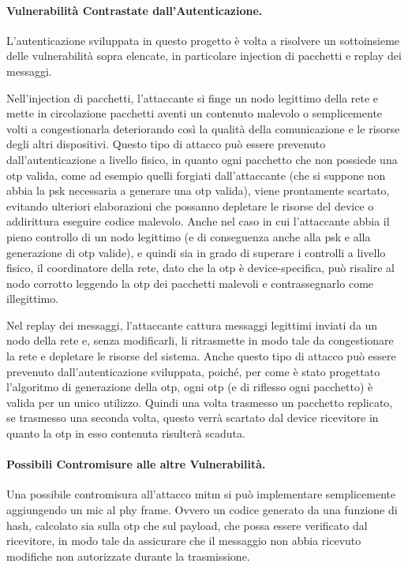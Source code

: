 \paragraph{Vulnerabilità Contrastate dall'Autenticazione.}

L'autenticazione sviluppata in questo progetto è volta a risolvere un sottoinsieme delle vulnerabilità sopra elencate, in particolare injection di pacchetti e replay dei messaggi.

Nell'injection di pacchetti, l'attaccante si finge un nodo legittimo della rete e mette in circolazione pacchetti aventi un contenuto malevolo o semplicemente volti a congestionarla deteriorando così la qualità della comunicazione e le risorse degli altri dispositivi. Questo tipo di attacco può essere prevenuto dall'autenticazione a livello fisico, in quanto ogni pacchetto che non possiede una \gls{otp} valida, come ad esempio quelli forgiati dall'attaccante (che si suppone non abbia la \gls{psk} necessaria a generare una \gls{otp} valida), viene prontamente scartato, evitando ulteriori elaborazioni che possanno depletare le risorse del device o addirittura eseguire codice malevolo. Anche nel caso in cui l'attaccante abbia il pieno controllo di un nodo legittimo (e di conseguenza anche alla \gls{psk} e alla generazione di \gls{otp} valide), e quindi sia in grado di superare i controlli a livello fisico, il coordinatore della rete, dato che la \gls{otp} è device-specifica, può risalire al nodo corrotto leggendo la \gls{otp} dei pacchetti malevoli e contrassegnarlo come illegittimo.

Nel replay dei messaggi, l'attaccante cattura messaggi legittimi inviati da un nodo della rete e, senza modificarli, li ritrasmette in modo tale da congestionare la rete e depletare le risorse del sistema. Anche questo tipo di attacco può essere prevenuto dall'autenticazione sviluppata, poiché, per come è stato progettato l'algoritmo di generazione della \gls{otp}, ogni \gls{otp} (e di riflesso ogni pacchetto) è valida per un unico utilizzo. Quindi una volta trasmesso un pacchetto replicato, se trasmesso una seconda volta, questo verrà scartato dal device ricevitore in quanto la \gls{otp} in esso contenuta risulterà scaduta.


\paragraph{Possibili Contromisure alle altre Vulnerabilità.}
Una possibile contromisura all'attacco \gls{mitm} si può implementare semplicemente aggiungendo un \gls{mic} al \gls{phy} frame. Ovvero un codice generato da una funzione di hash, calcolato sia sulla \gls{otp} che sul payload, che possa essere verificato dal ricevitore, in modo tale da assicurare che il messaggio non abbia ricevuto modifiche non autorizzate durante la trasmissione.

